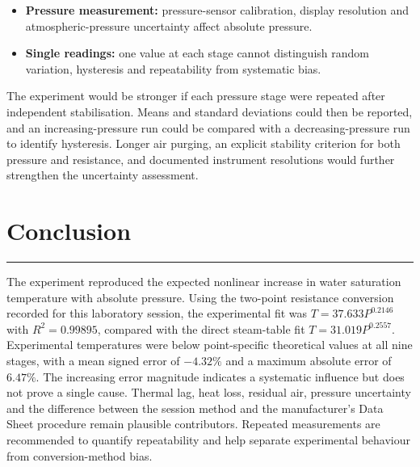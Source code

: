 \documentclass[11pt,a4paper]{article}
\newcommand{\sectionrule}{\vspace{-2pt}\color{rulegray}\hrule\color{black}\vspace{5pt}}
\begin{document}
\begin{itemize}
        Applied to the same raw readings, the session method gives a mean signed
        error of $-4.32\%$, whereas the manual method gives $-1.03\%$. The manual
        temperatures are higher by approximately $0.75\,{}^\circ\mathrm{C}$ at the
        first point and $8.32\,{}^\circ\mathrm{C}$ at the final point. This widening
        difference demonstrates that conversion choice can create a
        pressure-dependent error trend. These two results are sensitivity cases,
        not statistical uncertainty limits; without a traceable calibration and
        repeated readings, a defensible confidence interval cannot be assigned.
        This report retains the session method because it is documented in the
        primary evidence from the actual laboratory session.
  \item \textbf{Pressure measurement:} pressure-sensor calibration, display
        resolution and atmospheric-pressure uncertainty affect absolute pressure.
  \item \textbf{Single readings:} one value at each stage cannot distinguish
        random variation, hysteresis and repeatability from systematic bias.
\end{itemize}

The experiment would be stronger if each pressure stage were repeated after
independent stabilisation. Means and standard deviations could then be reported,
and an increasing-pressure run could be compared with a decreasing-pressure run
to identify hysteresis. Longer air purging, an explicit stability criterion for
both pressure and resistance, and documented instrument resolutions would
further strengthen the uncertainty assessment.

\section{Conclusion}
\sectionrule
The experiment reproduced the expected nonlinear increase in water saturation
temperature with absolute pressure. Using the two-point resistance conversion
recorded for this laboratory session, the experimental fit was
$T=37.633P^{0.2146}$ with $R^2=0.99895$, compared with the direct steam-table fit
$T=31.019P^{0.2557}$. Experimental temperatures were below point-specific
theoretical values at all nine stages, with a mean signed error of $-4.32\%$ and
a maximum absolute error of $6.47\%$. The increasing error magnitude indicates
a systematic influence but does not prove a single cause. Thermal lag, heat loss,
residual air, pressure uncertainty and the difference between the session method
and the manufacturer's Data Sheet procedure remain plausible contributors.
Repeated measurements are recommended to quantify repeatability and help
separate experimental behaviour from conversion-method bias.
\end{document}
